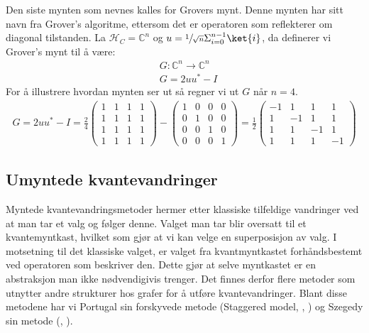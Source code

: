         Den siste mynten som nevnes kalles for Grovers mynt. Denne mynten har sitt navn fra Grover's algoritme, ettersom det er operatoren som reflekterer om diagonal tilstanden. La $\mathcal{H}_C=\mathbb{C}^n$ og $u=\sfrac{1}{\sqrt{n}}\Sigma_{i=0}^{n-1}\ket{i}$, da definerer vi Grover's mynt til å være:
        \begin{align*}
            & G:\mathbb{C}^n\rightarrow\mathbb{C}^n \\
            & G = 2uu^{*}-I
        \end{align*}
        For å illustrere hvordan mynten ser ut så regner vi ut $G$ når $n=4$.
        \begin{align*}
            G = 2uu^{*} - I = \frac{2}{4}\begin{pmatrix}
                1 & 1 & 1 & 1 \\
                1 & 1 & 1 & 1 \\
                1 & 1 & 1 & 1 \\
                1 & 1 & 1 & 1
            \end{pmatrix} - \begin{pmatrix}
                1 & 0 & 0 & 0 \\
                0 & 1 & 0 & 0 \\
                0 & 0 & 1 & 0 \\
                0 & 0 & 0 & 1
            \end{pmatrix} = \frac{1}{2}\begin{pmatrix}
                -1 & 1 & 1 & 1 \\
                1 & -1 & 1 & 1 \\
                1 & 1 & -1 & 1 \\
                1 & 1 & 1 & -1
            \end{pmatrix}
        \end{align*}

\subsection{Umyntede kvantevandringer}

    Myntede kvantevandringsmetoder hermer etter klassiske tilfeldige vandringer ved at man tar et valg og følger denne. Valget man tar blir oversatt til et kvantemyntkast, hvilket som gjør at vi kan velge en superposisjon av valg. I motsetning til det klassiske valget, er valget fra kvantmyntkastet forhåndsbestemt ved operatoren som beskriver den. Dette gjør at selve myntkastet er en abstraksjon man ikke nødvendigivis trenger. Det finnes derfor flere metoder som utnytter andre strukturer hos grafer for å utføre kvantevandringer. Blant disse metodene har vi Portugal sin forskyvede metode (Staggered model, \cite{Portugal_2015}, \cite{portugal_2019}) og Szegedy sin metode (\cite{dewolf2021quantum}, \cite{portugal_2019}).


